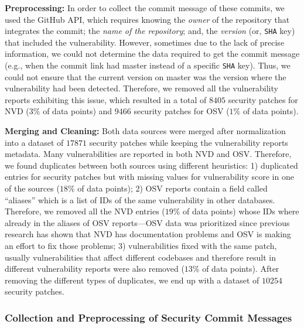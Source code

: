 \textbf{Preprocessing:}
In order to collect the commit message of these commits, we used the GitHub API, which requires knowing the \textit{owner} of the repository that integrates the commit; the \textit{name of the repository}; and, the \textit{version} (or, \texttt{SHA} key) that included the vulnerability. 
However, sometimes due to the lack of precise information, we could not determine the data required to get the commit message (e.g., when the commit link had master instead of a specific \texttt{SHA} key). Thus, we could not ensure that the current version on master was the version where the vulnerability had been detected. Therefore, we removed all the vulnerability reports exhibiting  this issue,  which resulted in a total of $8405$ security patches for NVD ($3\%$ of data points) and $9466$ security patches for OSV ($1\%$ of data points). 

\textbf{Merging and Cleaning:}
Both data sources were merged after normalization into a dataset of $17871$ security patches while keeping the vulnerability reports metadata. Many vulnerabilities 
are reported in both NVD and OSV. 
Therefore, we found duplicates between both sources using different heuristics: 1) duplicated entries for security patches but with missing values for vulnerability score in one of the sources ($18\%$ of data points); 2) OSV reports contain a field called ``aliases'' which is a list of IDs of the same vulnerability in other databases. Therefore, we removed all the NVD entries ($19\%$ of data points) whose IDs where already in the aliases of OSV reports---OSV data was prioritized since previous research has shown that NVD has documentation problems and OSV is making an effort to fix those problems;
3) vulnerabilities fixed with the same 
patch, usually vulnerabilities that affect 
different codebases and therefore result in different vulnerability reports were also removed ($13\%$ of data points).
After removing the different types of duplicates, we end up with a dataset of $10254$ security patches.


\subsubsection{Collection and Preprocessing of Security Commit Messages}

